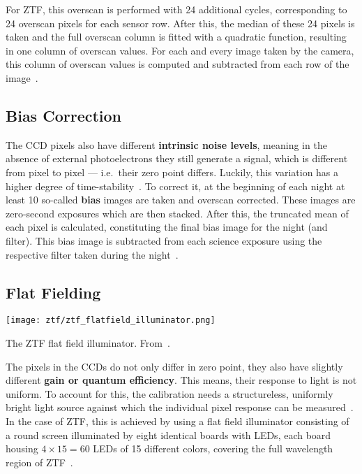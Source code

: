For ZTF, this overscan is performed with 24 additional cycles, corresponding to 24 overscan pixels for each sensor row. After this, the median of these 24 pixels is taken and the full overscan column is fitted with a quadratic function, resulting in one column of overscan values. For each and every image taken by the camera, this column of overscan values is computed and subtracted from each row of the image~\cite{Masci2019a}.

\subsection{Bias Correction}
The CCD pixels also have different \textbf{intrinsic noise levels}, meaning in the absence of external photoelectrons they still generate a signal, which is different from pixel to pixel --- i.e.\ their zero point differs. Luckily, this variation has a higher degree of time-stability~. To correct it, at the beginning of each night at least 10 so-called \textbf{bias} images are taken and overscan corrected. These images are zero-second exposures which are then stacked. After this, the truncated mean of each pixel is calculated, constituting the final bias image for the night (and filter). This bias image is subtracted from each science exposure using the respective filter taken during the night~\cite{Masci2019a}.

\subsection{Flat Fielding}

\begin{marginfigure}
    \texttt{[image: ztf/ztf\_flatfield\_illuminator.png]}
    \caption[ZTF flat field illuminator]{The ZTF flat field illuminator. From~\cite{Dekany2020}.}
\end{marginfigure}

The pixels in the CCDs do not only differ in zero point, they also have slightly different \textbf{gain or quantum efficiency}. This means, their response to light is not uniform. To account for this, the calibration needs a structureless, uniformly bright light source against which the individual pixel response can be measured~\cite{Howell2006}. In the case of ZTF, this is achieved by using a flat field illuminator consisting of a round screen illuminated by eight identical boards with LEDs, each board housing $4\times15=60$ LEDs of 15 different colors, covering the full wavelength region of ZTF~\cite{Dekany2020}.

